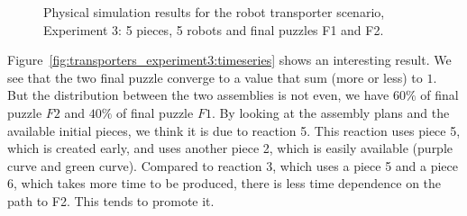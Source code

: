 \begin{figure}[h!]
	\centering
	\; %
	\caption{Physical simulation results for the robot transporter scenario, Experiment 3: 5 pieces, 5 robots and final puzzles F1 and F2.}
\label{fig:transporters_experiment3} %
\end{figure}

Figure~\ref{fig:transporters_experiment3:timeseries} shows an interesting result. We see that the two final puzzle converge to a value that sum (more or less) to $1$. But the distribution between the two assemblies is not even, we have $60\%$ of final puzzle $F2$ and $40\%$ of final puzzle $F1$. By looking at the assembly plans and the available initial pieces, we think it is due to reaction 5. This reaction uses piece 5, which is created early, and uses another piece 2, which is easily available (purple curve and green curve). Compared to reaction 3, which uses a piece 5 and a piece 6, which takes more time to be produced, there is less time dependence on the path to F2. This tends to promote it.

